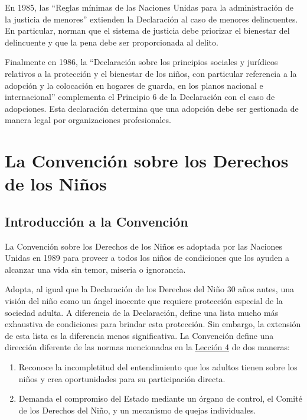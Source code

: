 \documentclass{tufte-handout}
\begin{document}
En 1985, las “Reglas mínimas de las Naciones Unidas para la administración de la justicia de menores” extienden la Declaración al caso de menores delincuentes. En particular, norman que el sistema de justicia debe priorizar el bienestar del delincuente y que la pena debe ser proporcionada al delito.

Finalmente en 1986, la “Declaración sobre los principios sociales y jurídicos relativos a la protección y el bienestar de los niños, con particular referencia a la adopción y la colocación en hogares de guarda, en los planos nacional e internacional” complementa el Principio 6 de la Declaración con el caso de adopciones. Esta declaración determina que una adopción debe ser gestionada de manera legal por organizaciones profesionales.

\section{La Convención sobre los Derechos de los Niños}\label{sec:convencion}

\subsection{Introducción a la Convención}\label{subsec:intro}


La Convención sobre los Derechos de los Niños es adoptada por las Naciones Unidas en 1989 para proveer a todos los niños de condiciones que los ayuden a alcanzar una vida sin temor, miseria o ignorancia. 

Adopta, al igual que la Declaración de los Derechos del Niño 30 años antes, una visión del niño como un ángel inocente que requiere protección especial de la sociedad adulta. A diferencia de la Declaración, define una lista mucho más exhaustiva de condiciones para brindar esta protección. Sin embargo, la extensión de esta lista es la diferencia menos significativa. La Convención define una dirección diferente de las normas mencionadas en la \hyperref[subsec:efecto]{Lección 4} de dos maneras:

\begin{enumerate}
\item{Reconoce la incompletitud del entendimiento que los adultos tienen sobre los niños y crea oportunidades para su participación directa.}
\item{Demanda el compromiso del Estado mediante un órgano de control, el Comité de los Derechos del Niño, y un mecanismo de quejas individuales.}
\end{enumerate}
\end{document}
